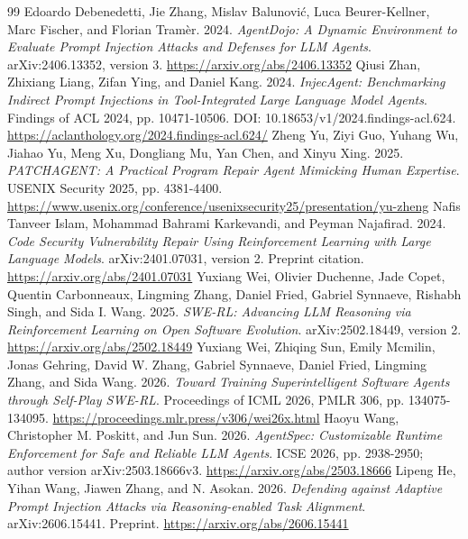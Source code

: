 \documentclass[11pt,a4paper]{article}
\begin{document}
\begin{thebibliography}{99}
 Edoardo Debenedetti, Jie Zhang, Mislav Balunovi\'{c}, Luca Beurer-Kellner, Marc Fischer, and Florian Tram\`{e}r. 2024. \emph{AgentDojo: A Dynamic Environment to Evaluate Prompt Injection Attacks and Defenses for LLM Agents}. arXiv:2406.13352, version 3. \url{https://arxiv.org/abs/2406.13352}
 Qiusi Zhan, Zhixiang Liang, Zifan Ying, and Daniel Kang. 2024. \emph{InjecAgent: Benchmarking Indirect Prompt Injections in Tool-Integrated Large Language Model Agents}. Findings of ACL 2024, pp. 10471-10506. DOI: 10.18653/v1/2024.findings-acl.624. \url{https://aclanthology.org/2024.findings-acl.624/}
 Zheng Yu, Ziyi Guo, Yuhang Wu, Jiahao Yu, Meng Xu, Dongliang Mu, Yan Chen, and Xinyu Xing. 2025. \emph{PATCHAGENT: A Practical Program Repair Agent Mimicking Human Expertise}. USENIX Security 2025, pp. 4381-4400. \url{https://www.usenix.org/conference/usenixsecurity25/presentation/yu-zheng}
 Nafis Tanveer Islam, Mohammad Bahrami Karkevandi, and Peyman Najafirad. 2024. \emph{Code Security Vulnerability Repair Using Reinforcement Learning with Large Language Models}. arXiv:2401.07031, version 2. Preprint citation. \url{https://arxiv.org/abs/2401.07031}
 Yuxiang Wei, Olivier Duchenne, Jade Copet, Quentin Carbonneaux, Lingming Zhang, Daniel Fried, Gabriel Synnaeve, Rishabh Singh, and Sida I. Wang. 2025. \emph{SWE-RL: Advancing LLM Reasoning via Reinforcement Learning on Open Software Evolution}. arXiv:2502.18449, version 2. \url{https://arxiv.org/abs/2502.18449}
 Yuxiang Wei, Zhiqing Sun, Emily Mcmilin, Jonas Gehring, David W. Zhang, Gabriel Synnaeve, Daniel Fried, Lingming Zhang, and Sida Wang. 2026. \emph{Toward Training Superintelligent Software Agents through Self-Play SWE-RL}. Proceedings of ICML 2026, PMLR 306, pp. 134075-134095. \url{https://proceedings.mlr.press/v306/wei26x.html}
 Haoyu Wang, Christopher M. Poskitt, and Jun Sun. 2026. \emph{AgentSpec: Customizable Runtime Enforcement for Safe and Reliable LLM Agents}. ICSE 2026, pp. 2938-2950; author version arXiv:2503.18666v3. \url{https://arxiv.org/abs/2503.18666}
 Lipeng He, Yihan Wang, Jiawen Zhang, and N. Asokan. 2026. \emph{Defending against Adaptive Prompt Injection Attacks via Reasoning-enabled Task Alignment}. arXiv:2606.15441. Preprint. \url{https://arxiv.org/abs/2606.15441}

\end{thebibliography}
\end{document}
